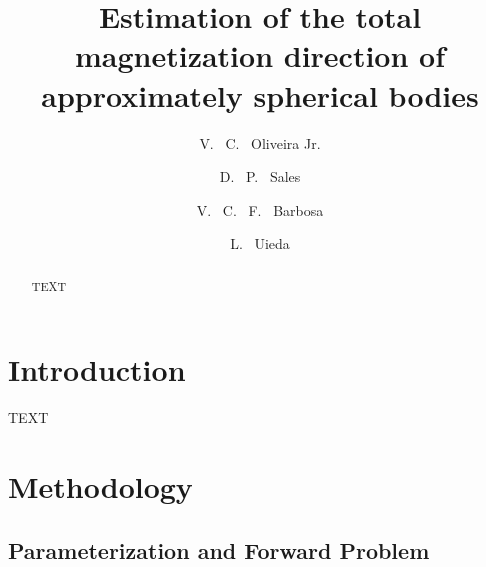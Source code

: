 \documentclass[journal abbreviation, npg]{copernicus}
\begin{document}
\linenumbers

\title{Estimation of the total magnetization direction of approximately spherical bodies}

\author[1]{V. ~C. ~Oliveira Jr.}
\author[1]{D. ~P. ~Sales}
\author[1]{V. ~C. ~F. ~Barbosa}
\author[1, 2]{L. ~Uieda}






\received{}
\pubdiscuss{} %
\revised{}
\accepted{}
\published{}



\maketitle  %

\begin{abstract}
TEXT
\end{abstract}

\section{Introduction}
TEXT

\section{Methodology}

\subsection{Parameterization and Forward Problem}
\end{document}
